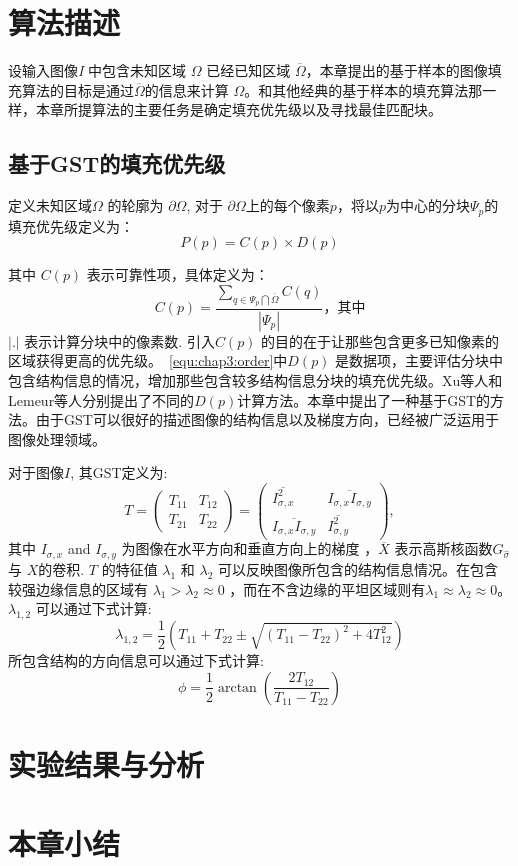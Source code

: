 \section{算法描述}
\label{algorithm}
设输入图像\emph{I} 中包含未知区域 \(\Omega\) 已经已知区域 \(\overline{\Omega}\)，本章提出的基于样本的图像填充算法的目标是通过\(\overline{\Omega}\)的信息来计算 \(\Omega\)。和其他经典的基于样本的填充算法那一样，本章所提算法的主要任务是确定填充优先级以及寻找最佳匹配块。
\subsection{基于GST的填充优先级}
\label{sec:sub:GST}

定义未知区域\(\Omega\) 的轮廓为 \(\partial\Omega\), 对于 \(\partial\Omega\)上的每个像素\(p\)，将以\(p\)为中心的分块\(\Psi_p\)的填充优先级定义为：
\begin{equation}
   \label{equ:chap3:order}
   P(p)=C(p)\times D(p)
\end{equation}

其中 \(C(p)\) 表示可靠性项\cite{Criminisi04regionfilling}，具体定义为： $$C(p)=\frac{\sum_{q\in\Psi_p\bigcap\overline{\Omega}}{C(q)}}{\left\vert{\Psi_p}\right\vert}，其中$$\(\left\vert.\right\vert\)  表示计算分块中的像素数. 引入\(C(p)\) 的目的在于让那些包含更多已知像素的区域获得更高的优先级。~\ref{equ:chap3:order}中\(D(p)\) 是数据项，主要评估分块中包含结构信息的情况，增加那些包含较多结构信息分块的填充优先级。Xu等人\cite{Xu:2010}和Lemeur等人\cite{LeMeur_2011}分别提出了不同的\(D(p)\)计算方法。本章中提出了一种基于GST的方法。由于GST可以很好的描述图像的结构信息以及梯度方向，已经被广泛运用于图像处理领域\cite{Kothe03edgeand}。 \par
 对于图像\(I\), 其GST定义为:
 $$T=\left(\begin{array}{cc}T_{11} & T_{12} \\ T_{21} &T_{22}\end{array}\right)=\left(\begin{array}{cc}\overline{I_{\sigma,x}^2} & \overline{I_{\sigma,x}I_{\sigma,y}} \\ \overline{I_{\sigma,x}I_{\sigma,y}} & \overline{I_{\sigma,y}^2}\end{array}\right),$$ 
 其中 \(I_{\sigma,x}\) and \(I_{\sigma,y}\)  为图像在水平方向和垂直方向上的梯度 ，\(\overline{X}\) 表示高斯核函数\(G_{\hat{\sigma}}\) 与 \(X\)的卷积. \(T\) 的特征值 \(\lambda_1\) 和 \(\lambda_2\) 可以反映图像所包含的结构信息情况。在包含较强边缘信息的区域有 \(\lambda_1>\lambda_2\approx0\) ，而在不含边缘的平坦区域则有\(\lambda_1\approx\lambda_2\approx0\)。 \( \lambda_{1,2} \) 可以通过下式计算: $$\lambda_{1,2}=\frac{1}{2}\left(T_{11}+T_{22}\pm\sqrt{\left(T_{11}-T_{22}\right)^2+4T^2_{12}}\right)$$ 
 所包含结构的方向信息可以通过下式计算:
$$\phi=\frac{1}{2}\arctan{\left(\frac{2T_{12}}{T_{11}-T_{22}}\right)}$$

\section{实验结果与分析}
\label{results}


\section{本章小结}
\label{conclusions}




